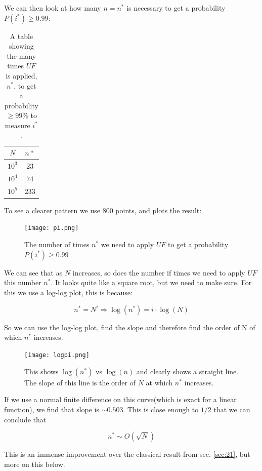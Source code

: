 \documentclass[a4paper,norsk, 10pt]{article}
\begin{document}
We can then look at how many $n = n^*$ is necessary to get a probability $P(i^*)\geq 0.99$:

\begin{table}[H]
\centering
\begin{tabular}{c | c}
$N$ & $n*$\\
\hline 
$10^3$ & $23$\\
$10^4$ & $74$\\
$10^5$ & $233$
\end{tabular}
\caption{A table showing the many times $UF$ is applied, $n^*$, to get a probability $\geq 99\%$ to measure $i^*$.}
\end{table}

To see a clearer pattern we use $800$ points, and plots the result:

\begin{figure}[H]
\centering
\texttt{[image: pi.png]}
\caption{The number of times $n^*$ we need to apply $UF$ to get a probability $P(i^*)\geq 0.99$ }
\end{figure}



We can see that as $N$ increases, so does the number if times we need to apply $UF$ this number $n^*$. It looks quite like a square root, but we need to make sure. For this we use a log-log plot, this is because:

\begin{equation}
n^* = N^i \Rightarrow \log(n^*) = i\cdot \log(N)
\end{equation}

So we can use the log-log plot, find the slope and therefore find the order of N of which $n^*$ increases.


\begin{figure}[H]
\centering
\texttt{[image: logpi.png]}
\caption{This shows $\log(n^*)$ vs $\log(n)$ and clearly shows a straight line. The slope of this line is the order of $N$ at which $n^*$ increases.}
\end{figure}


If we use a normal finite difference on this curve(which is exact for a linear function), we find that slope is $\sim 0.503$. This is close enough to $1/2$ that we can conclude that

\begin{equation}
n^* \sim O(\sqrt{N})
\end{equation}

This is an immense improvement over the classical result from sec. \ref{sec:21}, but more on this below.
\end{document}
